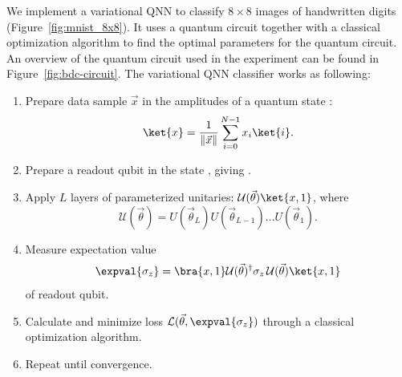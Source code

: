 \documentclass[a4paper,10pt]{article}
\begin{document}
We implement a variational QNN to classify $8 \times 8$ images of handwritten digits (Figure~\ref{fig:mnist_8x8}).
It uses a quantum circuit together with a classical optimization algorithm to find the optimal parameters for the quantum circuit.
An overview of the quantum circuit used in the experiment can be found in Figure~\ref{fig:bdc-circuit}.
The variational QNN classifier works as following:
\begin{enumerate}
	\item Prepare data sample $\vec{x}$ in the amplitudes of a quantum state :
	\begin{equation}
	 \ket{x} = \dfrac{1}{\lVert\vec{x}\rVert}\sum_{i=0}^{N-1} x_i\ket{i}.
	\end{equation}
	\item Prepare a readout qubit in the state , giving .
	\item Apply $L$ layers of parameterized unitaries: $\mathcal{U}(\vec{\theta})\ket{x, 1}$, where
	\begin{equation}
	\mathcal{U}(\vec{\theta}) = U(\vec{\theta}_L) U(\vec{\theta}_{L-1}) \ldots U(\vec{\theta}_1).
	\end{equation}
	\item Measure expectation value
	\begin{equation}
	\expval{\sigma_z} = \bra{x, 1}\mathcal{U}(\vec{\theta})^\dagger \sigma_z\, \mathcal{U}(\vec{\theta})\ket{x, 1}
	\end{equation}
	of readout qubit.
	\item Calculate and minimize loss $\mathcal{L}(\vec{\theta}, \expval{\sigma_z})$ through a classical optimization algorithm.
	\item Repeat until convergence.
\end{enumerate}
\end{document}
